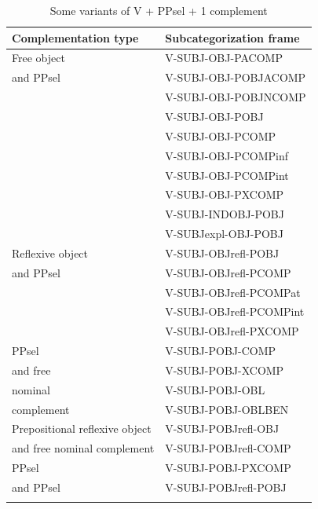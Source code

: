 \documentclass[output=paper]{langsci/langscibook}
\begin{document}
\begin{table}
  \begin{tabular}{ll}
    \lsptoprule
Complementation type & Subcategorization frame \\
    \midrule
Free object & V-SUBJ-OBJ-PACOMP \\
and PPsel & V-SUBJ-OBJ-POBJACOMP \\
& V-SUBJ-OBJ-POBJNCOMP \\
& V-SUBJ-OBJ-POBJ \\
& V-SUBJ-OBJ-PCOMP \\
& V-SUBJ-OBJ-PCOMPinf \\
& V-SUBJ-OBJ-PCOMPint \\
& V-SUBJ-OBJ-PXCOMP \\ 
& V-SUBJ-INDOBJ-POBJ \\
& V-SUBJexpl-OBJ-POBJ \\ \hline
Reflexive object  & V-SUBJ-OBJrefl-POBJ \\
 and PPsel  & V-SUBJ-OBJrefl-PCOMP \\
& V-SUBJ-OBJrefl-PCOMPat \\
& V-SUBJ-OBJrefl-PCOMPint \\
& V-SUBJ-OBJrefl-PXCOMP \\ \hline
PPsel & V-SUBJ-POBJ-COMP \\
and free  & V-SUBJ-POBJ-XCOMP \\
nominal  & V-SUBJ-POBJ-OBL \\
complement & V-SUBJ-POBJ-OBLBEN \\ \hline
Prepositional reflexive object & V-SUBJ-POBJrefl-OBJ \\
and free nominal complement & V-SUBJ-POBJrefl-COMP \\ \hline
PPsel & V-SUBJ-POBJ-PXCOMP \\
and PPsel & V-SUBJ-POBJrefl-POBJ \\ \hline
        \lspbottomrule
  \end{tabular}
  \caption{Some variants of  V + PPsel + 1 complement}
  \label{tab:mweiness:ppsel1comp}
\end{table}
 
%
%
%
%
%
\end{document}
